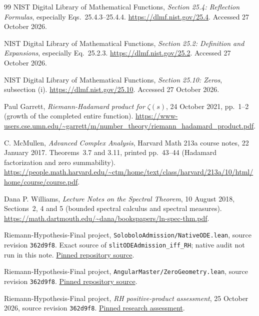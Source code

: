 \documentclass[11pt,a4paper]{article}
\numberwithin{equation}{section}
\theoremstyle{definition}
\theoremstyle{remark}
\begin{document}
\begin{thebibliography}{99}
\small
{}
NIST Digital Library of Mathematical Functions,
\emph{Section 25.4: Reflection Formulas}, especially Eqs.~25.4.3--25.4.4.
\url{https://dlmf.nist.gov/25.4}. Accessed 27 October 2026.

NIST Digital Library of Mathematical Functions,
\emph{Section 25.2: Definition and Expansions}, especially Eq.~25.2.3.
\url{https://dlmf.nist.gov/25.2}. Accessed 27 October 2026.

NIST Digital Library of Mathematical Functions,
\emph{Section 25.10: Zeros}, subsection (i).
\url{https://dlmf.nist.gov/25.10}. Accessed 27 October 2026.

Paul Garrett, \emph{Riemann-Hadamard product for $\zeta(s)$},
24 October 2021, pp.~1--2 (growth of the completed entire function).
\url{https://www-users.cse.umn.edu/~garrett/m/number_theory/riemann_hadamard_product.pdf}.

C. McMullen, \emph{Advanced Complex Analysis}, Harvard Math 213a
course notes, 22 January 2017. Theorems~3.7 and 3.11,
printed pp.~43--44 (Hadamard factorization and zero summability).
\url{https://people.math.harvard.edu/~ctm/home/text/class/harvard/213a/10/html/home/course/course.pdf}.

Dana P. Williams, \emph{Lecture Notes on the Spectral Theorem},
10 August 2018, Sections~2, 4 and 5 (bounded spectral calculus and
spectral measures).
\url{https://math.dartmouth.edu/~dana/bookspapers/ln-spec-thm.pdf}.

Riemann-Hypothesis-Final project, \texttt{SoloboloAdmission/NativeODE.lean},
source revision \texttt{362d9f8}. Exact source of
\texttt{slitODEAdmission\_iff\_RH}; native audit not run in this note.
\href{https://github.com/randogelist/Riemann-Hypothesis-Final/blob/362d9f8aeaaf9479cc27ceb6b63bdb7456267990/SoloboloAdmission/NativeODE.lean}{Pinned repository source}.

Riemann-Hypothesis-Final project, \texttt{AngularMaster/ZeroGeometry.lean},
source revision \texttt{362d9f8}.
\href{https://github.com/randogelist/Riemann-Hypothesis-Final/blob/362d9f8aeaaf9479cc27ceb6b63bdb7456267990/AngularMaster/ZeroGeometry.lean}{Pinned repository source}.

Riemann-Hypothesis-Final project,
\emph{RH positive-product assessment}, 25 October 2026,
source revision \texttt{362d9f8}.
\href{https://github.com/randogelist/Riemann-Hypothesis-Final/blob/362d9f8aeaaf9479cc27ceb6b63bdb7456267990/docs/research/2026-10-25/rh-positive-product-assessment.md}{Pinned research assessment}.


\end{thebibliography}
\end{document}
